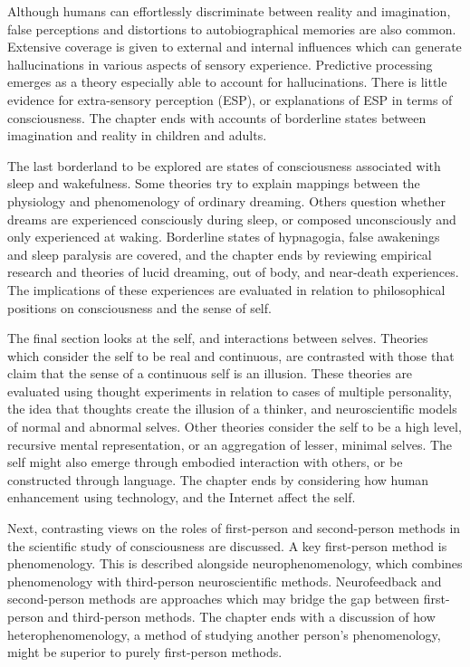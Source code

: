 \documentclass[a4paper]{article}
\begin{document}
Although humans can effortlessly discriminate between reality and imagination,
false perceptions and distortions to autobiographical memories are also
common. Extensive coverage is given to external and internal influences which
can generate hallucinations in various aspects of sensory experience.
Predictive processing emerges as a theory especially able to account for
hallucinations. There is little evidence for extra-sensory perception (ESP),
or explanations of ESP in terms of consciousness. The chapter ends with
accounts of borderline states between imagination and reality in children and
adults.

The last borderland to be explored are states of consciousness associated with
sleep and wakefulness. Some theories try to explain mappings between the
physiology and phenomenology of ordinary dreaming. Others question whether
dreams are experienced consciously during sleep, or composed unconsciously and
only experienced at waking. Borderline states of hypnagogia, false awakenings
and sleep paralysis are covered, and the chapter ends by reviewing empirical
research and theories of lucid dreaming, out of body, and near-death
experiences. The implications of these experiences are evaluated in relation
to philosophical positions on consciousness and the sense of self.

The final section looks at the self, and interactions between selves. Theories
which consider the self to be real and continuous, are contrasted with those
that claim that the sense of a continuous self is an illusion. These theories
are evaluated using thought experiments in relation to cases of multiple
personality, the idea that thoughts create the illusion of a thinker, and
neuroscientific models of normal and abnormal selves. Other theories consider
the self to be a high level, recursive mental representation, or an
aggregation of lesser, minimal selves. The self might also emerge through
embodied interaction with others, or be constructed through language. The
chapter ends by considering how human enhancement using technology, and the
Internet affect the self.

Next, contrasting views on the roles of first-person and second-person methods
in the scientific study of consciousness are discussed. A key first-person
method is phenomenology. This is described alongside neurophenomenology, which
combines phenomenology with third-person neuroscientific methods.
Neurofeedback and second-person methods are approaches which may bridge the
gap between first-person and third-person methods. The chapter ends with a
discussion of how heterophenomenology, a method of studying another person’s
phenomenology, might be superior to purely first-person methods.
\end{document}
